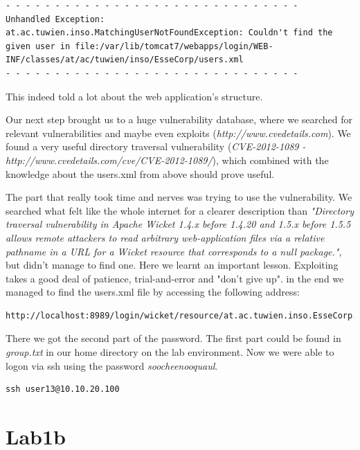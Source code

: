 \documentclass[12pt,a4paper,titlepage,oneside]{scrartcl}
\begin{document}
\begin{lstlisting}[style=simple]
- - - - - - - - - - - - - - - - - - - - - - - - - - - - - -
Unhandled Exception:
at.ac.tuwien.inso.MatchingUserNotFoundException: Couldn't find the given user in file:/var/lib/tomcat7/webapps/login/WEB-INF/classes/at/ac/tuwien/inso/EsseCorp/users.xml
- - - - - - - - - - - - - - - - - - - - - - - - - - - - - -
\end{lstlisting}

This indeed told a lot about the web application's structure.

Our next step brought us to a huge vulnerability database, where we searched for relevant vulnerabilities and maybe even exploits (\emph{http://www.cvedetails.com}). We found a very useful directory traversal vulnerability (\emph{CVE-2012-1089 - http://www.cvedetails.com/cve/CVE-2012-1089/}), which combined with the knowledge about the users.xml from above should prove useful.

The part that really took time and nerves was trying to use the vulnerability. We searched what felt like the whole internet for a clearer description than \emph{"Directory traversal vulnerability in Apache Wicket 1.4.x before 1.4.20 and 1.5.x before 1.5.5 allows remote attackers to read arbitrary web-application files via a relative pathname in a URL for a Wicket resource that corresponds to a null package."}, but didn't manage to find one. Here we learnt an important lesson. Exploiting takes a good deal of patience, trial-and-error and "don't give up".
in the end we managed to find the users.xml file by accessing the following address:

\begin{lstlisting}[style=simple]
http://localhost:8989/login/wicket/resource/at.ac.tuwien.inso.EsseCorp.Login/users.xml
\end{lstlisting}

There we got the second part of the password. The first part could be found in \emph{group.txt} in our home directory on the lab environment.
Now we were able to logon via ssh using the password \emph{soocheenooquaul}.

\begin{lstlisting}[style=simple]
ssh user13@10.10.20.100
\end{lstlisting}

\section{Lab1b}
\end{document}
